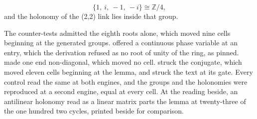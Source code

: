 \begin{chproof}[census]
\begin{equation}
\{1,\ i,\ -1,\ -i\} \cong \mathbb{Z}/4 ,
\end{equation}
and the holonomy of the (2,2) link lies inside that group.

The counter-tests admitted the eighth roots alone, which moved nine cells beginning at the generated groups. offered a continuous phase variable at an entry, which the derivation refused as no root of unity of the ring, as pinned. made one end non-diagonal, which moved no cell. struck the conjugate, which moved eleven cells beginning at the lemma, and struck the text at its gate. Every control read the same at both engines, and the groups and the holonomies were reproduced at a second engine, equal at every cell. At the reading beside, an antilinear holonomy read as a linear matrix parts the lemma at twenty-three of the one hundred two cycles, printed beside for comparison.
\end{chproof}
